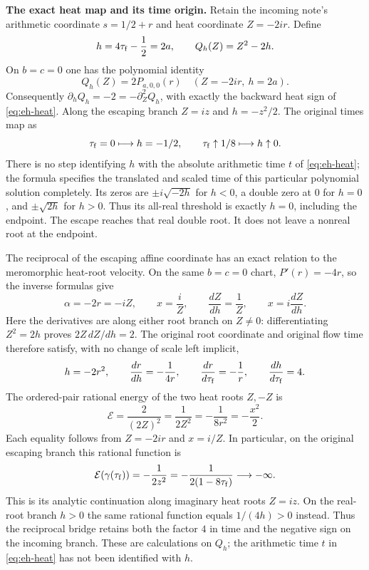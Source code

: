 \documentclass[11pt,a4paper]{article}
\theoremstyle{definition}\newtheorem{definition}[theorem]{Definition}
\begin{document}
\EH\textbf{The exact heat map and its time origin.}
Retain the incoming note's arithmetic coordinate
$s=1/2+r$ and heat coordinate $Z=-2ir$. Define
\[
 h=4\tau_{\rm f}-\frac12=2a,\qquad
 Q_h(Z)=Z^2-2h.
\]
On $b=c=0$ one has the polynomial identity
\[
 Q_h(Z)=2P_{a,0,0}(r)\quad (Z=-2ir,\ h=2a).
\]
Consequently $\partial_hQ_h=-2=-\partial_Z^2Q_h$, with exactly the
backward heat sign of \eqref{eq:eh-heat}. Along the escaping branch
$Z=iz$ and $h=-z^2/2$. The original times map as
\[
 \tau_{\rm f}=0\longmapsto h=-1/2,\qquad
 \tau_{\rm f}\uparrow1/8\longmapsto h\uparrow0.
\]
There is no step identifying $h$ with the absolute arithmetic time $t$
of \eqref{eq:eh-heat}; the formula specifies the translated and scaled
time of this particular polynomial solution completely.
Its zeros are $\pm i\sqrt{-2h}$ for $h<0$, a double zero at $0$ for
$h=0$, and $\pm\sqrt{2h}$ for $h>0$. Thus its all-real threshold is
exactly $h=0$, including the endpoint. The escape reaches that real
double root. It does not leave a nonreal root at the endpoint.

The reciprocal of the escaping affine coordinate has an exact relation
to the meromorphic heat-root velocity. On the same $b=c=0$ chart,
$P'(r)=-4r$, so the inverse formulas give
\begin{equation}
 \alpha=-2r=-iZ,\qquad x=\frac{i}{Z},\qquad
 \frac{dZ}{dh}=\frac1Z,\qquad
 x=i\frac{dZ}{dh}.
 \label{eq:eh-reciprocal-bridge}
\end{equation}
Here the derivatives are along either root branch on $Z\ne0$:
differentiating $Z^2=2h$ proves $2Z\,dZ/dh=2$. The original root
coordinate and original flow time therefore satisfy, with no change
of scale left implicit,
\begin{equation}
 h=-2r^2,\qquad \frac{dr}{dh}=-\frac1{4r},\qquad
 \frac{dr}{d\tau_{\rm f}}=-\frac1r,
 \qquad \frac{dh}{d\tau_{\rm f}}=4.
 \label{eq:eh-original-reciprocal}
\end{equation}
The ordered-pair rational energy of the two heat roots $Z,-Z$ is
\begin{equation}
 \mathcal E=\frac{2}{(2Z)^2}
 =\frac1{2Z^2}=-\frac1{8r^2}=-\frac{x^2}{2}.
 \label{eq:eh-energy-coordinates}
\end{equation}
Each equality follows from $Z=-2ir$ and $x=i/Z$. In particular, on
the original escaping branch this rational function is
\begin{equation}
 \mathcal E(\gamma(\tau_{\rm f}))
 =-\frac1{2z^2}=-\frac1{2(1-8\tau_{\rm f})}
 \longrightarrow-\infty.
 \label{eq:eh-incoming-energy}
\end{equation}
This is its analytic continuation along imaginary heat roots $Z=iz$.
On the real-root branch $h>0$ the same rational function equals
$1/(4h)>0$ instead. Thus the reciprocal bridge retains both the
factor $4$ in time and the negative sign on the incoming branch.
These are calculations on $Q_h$; the arithmetic time $t$ in
\eqref{eq:eh-heat} has not been identified with $h$.
\end{document}
